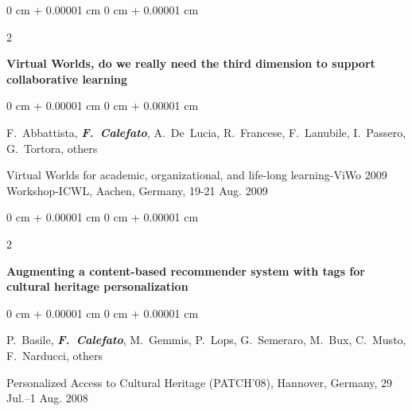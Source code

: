 \documentclass[10pt, a4paper]{article}
\newenvironment{onecolentry}{
    \begin{adjustwidth}{
        0 cm + 0.00001 cm
    }{
        0 cm + 0.00001 cm
    }
}{
    \end{adjustwidth}
} %
\newenvironment{twocolentry}[2][]{
    \onecolentry
    \def\secondColumn{#2}
    \setcolumnwidth{\fill, 4.5 cm}
    \begin{paracol}{2}
}{
    \switchcolumn \raggedleft \secondColumn
    \end{paracol}
    \endonecolentry
} %
\begin{document}
        \begin{samepage}
            \begin{twocolentry}{
                2009
            }
                \textbf{Virtual Worlds, do we really need the third dimension to support collaborative learning}
            \end{twocolentry}

            \vspace{0.10 cm}
            
            \begin{onecolentry}
                \mbox{F. Abbattista}, \mbox{\textbf{\textit{F. Calefato}}}, \mbox{A. De Lucia}, \mbox{R. Francese}, \mbox{F. Lanubile}, \mbox{I. Passero}, \mbox{G. Tortora}, \mbox{others}

                \vspace{0.10 cm}
                
        Virtual Worlds for academic, organizational, and life-long learning-ViWo 2009 Workshop-ICWL, Aachen, Germany, 19-21 Aug. 2009\end{onecolentry}
        \end{samepage}

        \vspace{0.2 cm}

        \begin{samepage}
            \begin{twocolentry}{
                2008
            }
                \textbf{Augmenting a content-based recommender system with tags for cultural heritage personalization}
            \end{twocolentry}

            \vspace{0.10 cm}
            
            \begin{onecolentry}
                \mbox{P. Basile}, \mbox{\textbf{\textit{F. Calefato}}}, \mbox{M. Gemmis}, \mbox{P. Lops}, \mbox{G. Semeraro}, \mbox{M. Bux}, \mbox{C. Musto}, \mbox{F. Narducci}, \mbox{others}

                \vspace{0.10 cm}
                
        Personalized Access to Cultural Heritage (PATCH'08), Hannover, Germany, 29 Jul.–1 Aug. 2008\end{onecolentry}
        \end{samepage}

        \vspace{0.2 cm}
\end{document}
